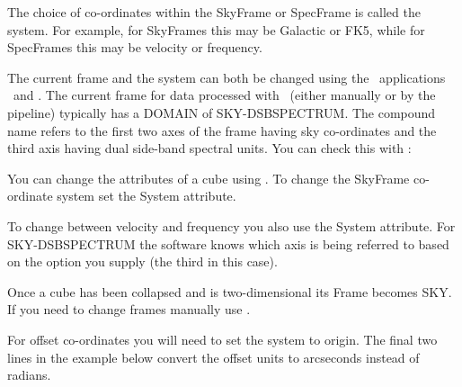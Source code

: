 \documentclass[11pt,oneside,chapters]{starlink}
\providecommand{\att}[1]{\textsf{#1}}
\begin{document}
The choice of co-ordinates within the SkyFrame or SpecFrame is called
the system. For example, for SkyFrames this may be Galactic or FK5,
while for SpecFrames this may be velocity or frequency.

The current frame and the system can both be changed using the \Kappa\
applications \wcsframe\ and \wcsattrib. The current frame for data
processed with \makecube\ (either manually or by the pipeline)
typically has a DOMAIN of SKY-DSBSPECTRUM. The compound name refers to
the first two axes of the frame having sky co-ordinates and the third
axis having dual side-band spectral units. You can check this with
\ndftrace:

\begin{terminalv}
\end{terminalv}
You can change the attributes of a cube using \wcsattrib. To change
the SkyFrame co-ordinate system set the \att{System} attribute.
\begin{terminalv}
\end{terminalv}
To change between velocity and frequency you also use the
\att{System} attribute. For SKY-DSBSPECTRUM the software knows which
axis is being referred to based on the option you supply (the third in
this case).
\begin{terminalv}
\end{terminalv}
Once a cube has been collapsed and is two-dimensional its Frame
becomes SKY. If you need to change frames manually use \wcsframe.
\begin{terminalv}
\end{terminalv}

For offset co-ordinates you will need to set the system
 to origin. The final two lines in the example below
convert the offset units to arcseconds instead of radians.
\begin{terminalv}
\end{terminalv}

%

%
\end{document}
